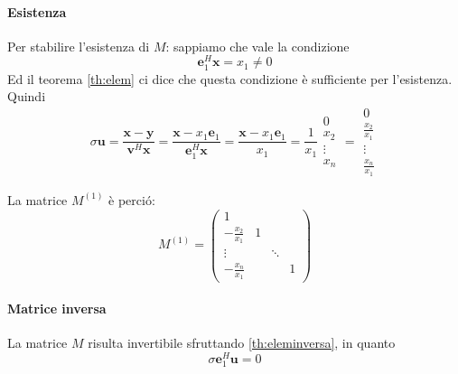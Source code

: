 \paragraph{Esistenza}
 Per stabilire l'esistenza di $M$: sappiamo che vale la condizione
  $$\mathbf{e}_1^{H} \mathbf{x} = x_1 \neq 0$$
 Ed il teorema \ref{th:elem} ci dice che questa condizione \`e sufficiente
 per l'esistenza.\\
Quindi
$$ \sigma \mathbf{u} = \frac{\mathbf{x}-\mathbf{y}}{\mathbf{v}^{H}\mathbf{x}}
=  \frac{\mathbf{x} - x_1\mathbf{e}_1}{\mathbf{e}^{H}_1\mathbf{x}}
=  \frac{\mathbf{x} - x_1\mathbf{e}_1}{x_1} = \frac{1}{x_1}
\begin{array}{|l|}
  0                                               \\
  x_2                                             \\ 
  \vdots                                          \\ 
  x_n
\end{array} 
=
\begin{array}{|l|}
  0                                               \\
  \frac{x_2}{x_1}                                 \\ 
  \vdots                                          \\ 
  \frac{x_n}{x_1}
\end{array} $$

 
La matrice $M^{(1)}$ \`e perció:
\[M^{(1)} = 
\begin{pmatrix}
1                &   &        &                   \\
-\frac{x_2}{x_1} & 1 &        &                   \\
\vdots           &   & \ddots &                   \\
-\frac{x_n}{x_1} &   &        & 1 
\end{pmatrix}\]

\paragraph{Matrice inversa}
 La matrice $M$ risulta invertibile sfruttando \ref{th:eleminversa}, in quanto
$$ \sigma \mathbf{e}_1^{H}\mathbf{u} = 0$$

